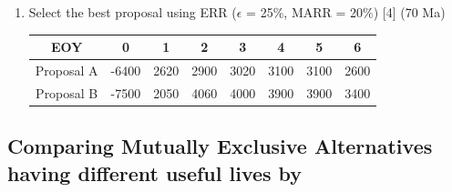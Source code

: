 \documentclass[12pt]{article}
\begin{document}
\begin{enumerate}
			\item Select the best proposal using ERR ($\epsilon$ = 25\%, MARR = 20\%) \hfill [4] (70 Ma)\\
			\begin{tabular}{|c|c|c|c|c|c|c|c|}
				\hline
				EOY & 0 & 1 & 2 & 3 & 4 & 5 & 6 \\ \hline
				Proposal A & -6400 & 2620 & 2900 & 3020 & 3100 & 3100 & 2600 \\ \hline
				Proposal B & -7500 & 2050 & 4060 & 4000 & 3900 & 3900 & 3400 \\ \hline
			\end{tabular}
		\end{enumerate}
	
	\subsection{Comparing Mutually Exclusive Alternatives having different useful lives by}
\end{document}
